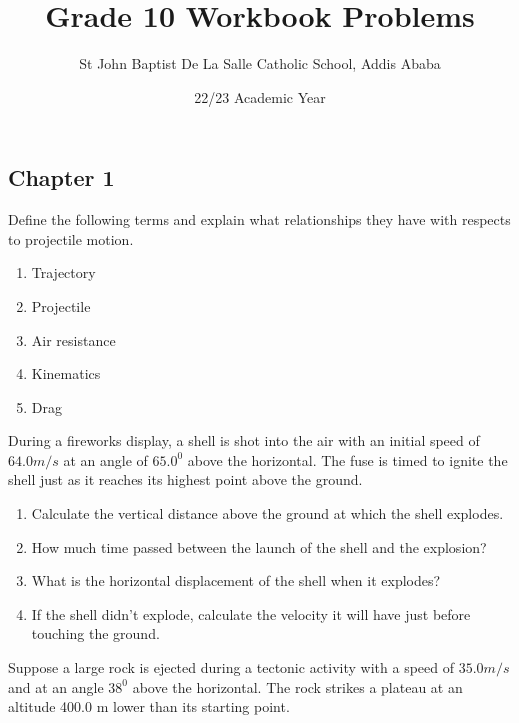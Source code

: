 \documentclass[12pt,addpoints]{exam}
\author{St John Baptist De La Salle Catholic School, Addis Ababa}
\date{22/23 Academic Year}
\begin{document}
	\title{Grade 10 Workbook Problems}
	\maketitle
	
	\begin{center}
		\subsection*{Chapter 1}
	\end{center}
	\begin{questions}
		\question Define the following terms and explain what relationships they have with respects to projectile motion.
		\begin{enumerate}[label=(\roman*)]
			\item Trajectory\vspace{0.5in}
			\item Projectile\vspace{0.5in} 
			\item Air resistance\vspace{0.5in}
			\item Kinematics\vspace{0.5in}
			\item Drag\vspace{0.5in}
		\end{enumerate}
		\question During a fireworks display, a shell is shot into the air with an initial speed of $64.0 m/s$ at an angle of $65.0^0$ above the horizontal. The fuse is timed to ignite the shell just as it reaches its highest point above the ground.
		\begin{enumerate}[label=(\roman*)]
			\item  Calculate the vertical distance above the ground at which the shell explodes.\vspace{1.5in}
			\item  How much time passed between the launch of the shell and the explosion?\vspace{1.5in}
			\item  What is the horizontal displacement of the shell when it explodes?\vspace{1.5in}
			\item  If the shell didn't explode, calculate the velocity it will have just before touching the ground.\vspace{1.5in}
		\end{enumerate}
		\question Suppose a large rock is ejected during a tectonic activity with a speed of $35.0 m/s$ and at an angle $38^0$ above the horizontal. The rock strikes a plateau at an altitude 400.0 m lower than its starting point. 

\end{questions}
\end{document}
